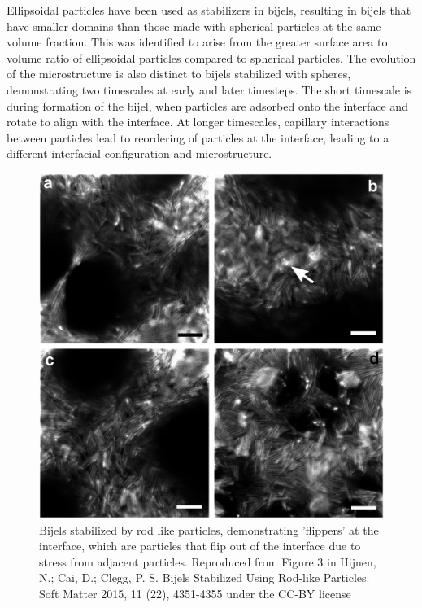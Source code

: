 Ellipsoidal particles have been used as stabilizers in bijels, resulting in bijels that have smaller domains than those made with spherical particles at the same volume fraction. This was identified to arise 
from the greater surface area to volume ratio of ellipsoidal particles compared to spherical particles. \cite{gunther_timescales_2014} The evolution of the microstructure is also distinct to bijels 
stabilized with spheres, demonstrating two timescales at early and later timesteps. \cite{gunther_timescales_2014} The short timescale is during formation of the bijel, when particles are adsorbed onto the
interface and rotate to align with the interface. At longer timescales, capillary interactions between particles lead to reordering of particles at the interface, leading to a different interfacial 
configuration and microstructure. \cite{gunther_timescales_2014}

\begin{figure}
    \centering
    \includegraphics[scale = 0.3]{../figures/literature_review/rods_bijels.png}
    \caption{Bijels stabilized by rod like particles, demonstrating 'flippers' at the interface, which are particles that flip out of the interface due to stress from adjacent particles. 
             Reproduced from Figure 3 in Hijnen, N.; Cai, D.; Clegg, P. S. Bijels Stabilized Using Rod-like Particles. Soft Matter 2015, 11 (22), 4351-4355 under the CC-BY license}
    \label{fig:rod_bijel_flippers}
\end{figure}


